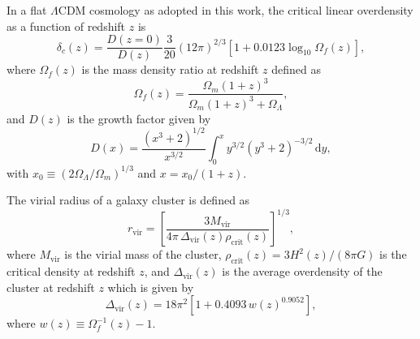 \documentclass[modern]{aastex62}
\newcommand{\R}[1]{\mathrm{#1}}
\newcommand{\D}[1]{\R{d} #1}
\newcommand{\lcdm}{$\Lambda$CDM}
\begin{document}
In a flat \lcdm{} cosmology as adopted in this work, the critical linear
overdensity as a function of redshift $z$ is \citep{kitayama1996,randall2002}
\begin{equation}
  \label{eq:delta-crit}
  \delta_c(z) = \frac{D(z=0)}{D(z)} \frac{3}{20} (12\pi)^{2/3}
    \left[1 + 0.0123 \log_{10} \Omega_f(z) \right],
\end{equation}
where $\Omega_f(z)$ is the mass density ratio at redshift $z$ defined as
\begin{equation}
  \label{eq:omega-fz}
  \Omega_f(z) = \frac{\Omega_m(1+z)^3}{\Omega_m(1+z)^3 + \Omega_{\Lambda}},
\end{equation}
and $D(z)$ is the growth factor given by \citep[Equation~(13.6)]{peebles1980}
\begin{equation}
  \label{eq:growth-factor}
  D(x) = \frac{(x^3 + 2)^{1/2}}{x^{3/2}}
    \int_0^x y^{3/2} (y^3 + 2)^{-3/2} \,\D{y},
\end{equation}
with $x_0 \equiv (2\Omega_{\Lambda}/\Omega_m)^{1/3}$ and $x = x_0 / (1+z)$.

The virial radius of a galaxy cluster is defined as
\begin{equation}
  \label{eq:radius-virial}
  r_{\R{vir}} = \left[
    \frac{3 M_{\R{vir}}}{4\pi \,\Delta_{\R{vir}}(z) \rho_{\R{crit}}(z)}
  \right]^{1/3},
\end{equation}
where $M_{\R{vir}}$ is the virial mass of the cluster,
$\rho_{\R{crit}}(z) = 3 H^2(z) / (8\pi G)$ is the critical density
at redshift $z$,
and $\Delta_{\R{vir}}(z)$ is the average overdensity of the cluster
at redshift $z$ which is given by \citep{kitayama1996,cassano2005}
\begin{equation}
  \label{eq:delta-vir}
  \Delta_{\R{vir}}(z) = 18\pi^2 \left[ 1 + 0.4093 \, w(z)^{0.9052} \right],
\end{equation}
where $w(z) \equiv \Omega_f^{-1}(z) - 1$.





\end{document}
